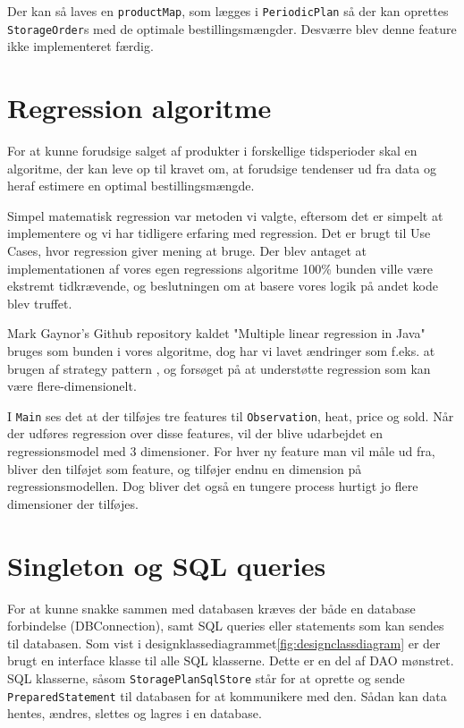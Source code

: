 Der kan så laves en \verb|productMap|, som lægges i \verb|PeriodicPlan| så der kan oprettes \verb|StorageOrder|s med de optimale bestillingsmængder. Desværre blev denne feature ikke implementeret færdig.

\section{Regression algoritme}
For at kunne forudsige salget af produkter i forskellige tidsperioder skal en algoritme, der kan leve op til kravet om, at forudsige tendenser ud fra data og heraf estimere en optimal bestillingsmængde.

Simpel matematisk regression var metoden vi valgte, eftersom det er simpelt at implementere og vi har tidligere erfaring med regression. Det er brugt til Use Cases, hvor regression giver mening at bruge. Der blev antaget at implementationen af vores egen regressions algoritme 100\% bunden ville være ekstremt tidkrævende, og beslutningen om at basere vores logik på andet kode blev truffet.

Mark Gaynor's Github repository kaldet "Multiple linear regression in Java" \cite{MarkGaynorRegressin} bruges som bunden i vores algoritme, dog har vi lavet ændringer som f.eks. at brugen af strategy pattern \cite{Larman2004}, og forsøget på at understøtte regression som kan være flere-dimensionelt. 

I \texttt{Main} ses det at der tilføjes tre features til \texttt{Observation}, heat, price og sold. Når der udføres regression over disse features, vil der blive udarbejdet en regressionsmodel med 3 dimensioner. For hver ny feature man vil måle ud fra, bliver den tilføjet som feature, og tilføjer endnu en dimension på regressionsmodellen. Dog bliver det også en tungere process hurtigt jo flere dimensioner der tilføjes. 

\section{Singleton og SQL queries}
For at kunne snakke sammen med databasen kræves der både en database forbindelse (DBConnection), samt SQL queries eller statements som kan sendes til databasen. Som vist i designklassediagrammet\ref{fig:designclassdiagram} er der brugt en interface klasse til alle SQL klasserne. Dette er en del af DAO mønstret\cite{DAO}. SQL klasserne, såsom \texttt{StoragePlanSqlStore} står for at oprette og sende \texttt{PreparedStatement} til databasen for at kommunikere med den. Sådan kan data hentes, ændres, slettes og lagres i en database. 

